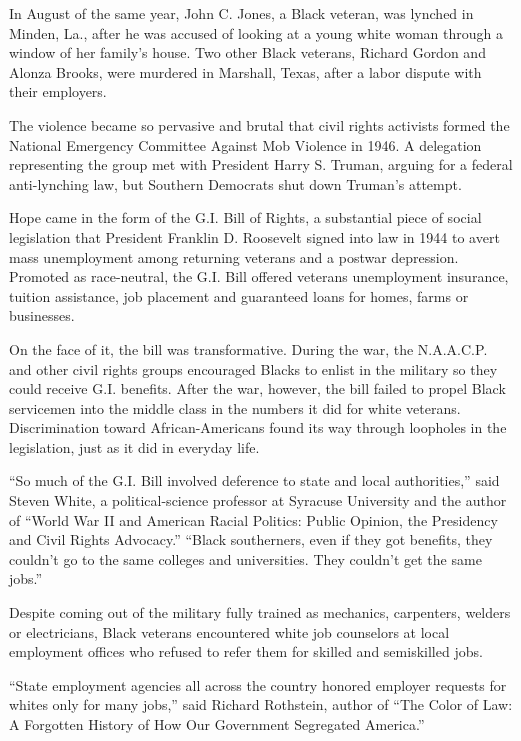 In August of the same year, John C. Jones, a Black veteran, was lynched
in Minden, La., after he was accused of looking at a young white woman
through a window of her family's house. Two other Black veterans,
Richard Gordon and Alonza Brooks, were murdered in Marshall, Texas,
after a labor dispute with their employers.

The violence became so pervasive and brutal that civil rights activists
formed the National Emergency Committee Against Mob Violence in 1946. A
delegation representing the group met with President Harry S. Truman,
arguing for a federal anti-lynching law, but Southern Democrats shut
down Truman's attempt.

Hope came in the form of the G.I. Bill of Rights, a substantial piece of
social legislation that President Franklin D. Roosevelt signed into law
in 1944 to avert mass unemployment among returning veterans and a
postwar depression. Promoted as race-neutral, the G.I. Bill offered
veterans unemployment insurance, tuition assistance, job placement and
guaranteed loans for homes, farms or businesses.

On the face of it, the bill was transformative. During the war, the
N.A.A.C.P. and other civil rights groups encouraged Blacks to enlist in
the military so they could receive G.I. benefits. After the war,
however, the bill failed to propel Black servicemen into the middle
class in the numbers it did for white veterans. Discrimination toward
African-Americans found its way through loopholes in the legislation,
just as it did in everyday life.

``So much of the G.I. Bill involved deference to state and local
authorities,'' said Steven White, a political-science professor at
Syracuse University and the author of ``World War II and American Racial
Politics: Public Opinion, the Presidency and Civil Rights Advocacy.''
``Black southerners, even if they got benefits, they couldn't go to the
same colleges and universities. They couldn't get the same jobs.''

Despite coming out of the military fully trained as mechanics,
carpenters, welders or electricians, Black veterans encountered white
job counselors at local employment offices who refused to refer them for
skilled and semiskilled jobs.

``State employment agencies all across the country honored employer
requests for whites only for many jobs,'' said Richard Rothstein, author
of ``The Color of Law: A Forgotten History of How Our Government
Segregated America.''

